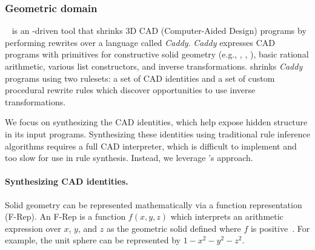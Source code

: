 \subsubsection{Geometric domain}
\label{subsec:geo-domain}
\newcommand{\Caddy}{\textit{Caddy}\xspace}
\newcommand{\CoreCaddy}{\textit{Core Caddy}\xspace}

\sz~\citep{szalinski} is an \eqsat-driven
  tool that shrinks 3D CAD (Computer-Aided Design) programs
  by performing rewrites
  over a language called \Caddy.
  \Caddy expresses CAD programs with
  primitives for
  constructive solid geometry (e.g., , , ),
  basic rational arithmetic,
  various list constructors,
  and inverse transformations.
\sz shrinks \Caddy programs using
  two rulesets:
  a set of CAD
  identities
  and a set of custom procedural rewrite rules
  which discover opportunities to use inverse
  transformations.

We focus on synthesizing
  the CAD identities,
  which help \sz expose
  hidden structure in its input programs.
Synthesizing these identities using
  traditional rule inference algorithms
  requires a full CAD interpreter,
  which is difficult to implement and
  too slow for use in rule synthesis.
Instead, we leverage \enumo's \ff approach.

\paragraph*{Synthesizing CAD identities.}
Solid geometry can be
  represented mathematically via
  a function representation (F-Rep).
An F-Rep is a function $f(x, y, z)$
  which interprets an arithmetic expression
  over $x$, $y$, and $z$ as the geometric solid
  defined where $f$ is positive~\citep{frep}.
For example, the unit sphere can be represented
  by $1 - x^2 - y^2 - z^2$.

